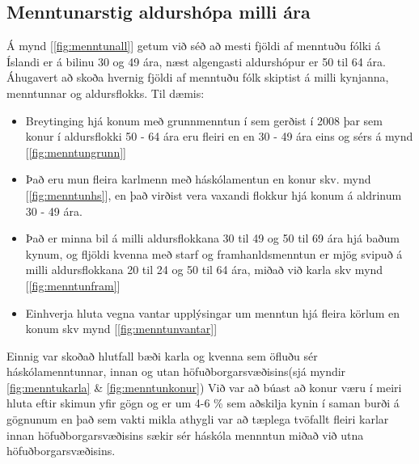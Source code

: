 \documentclass[12pt, git, draft]{rureport}
\begin{document}
\subsection{Menntunarstig aldurshópa milli ára}
Á mynd [\ref{fig:menntunall}] getum við séð að mesti fjöldi af menntuðu fólki á Íslandi er á bilinu 30 og 49 ára, næst algengasti aldurshópur er 50 til 64 ára.
Áhugavert að skoða hvernig fjöldi af menntuðu fólk skiptist á milli kynjanna, menntunnar og aldursflokks. Til dæmis:
\begin{itemize}  
	
	\item Breytinging hjá konum með grunnmenntun í sem gerðist í  2008 þar sem konur í aldursflokki 50 - 64 ára eru fleiri en  en 30 - 49 ára eins og sérs á mynd [\ref{fig:menntungrunn}]
	
	\item Það eru mun fleira karlmenn með háskólamentun en konur skv. mynd [\ref{fig:menntunhs}], en það virðist vera vaxandi flokkur hjá konum á aldrinum 30 - 49 ára.
	
	\item Það er minna bil á milli aldursflokkana 30 til 49 og 50 til 69 ára hjá baðum kynum, og fljöldi kvenna með starf og framhanldsmenntun er mjög svipuð á milli aldursflokkana 20 til 24 og 50 til 64 ára, miðað við karla skv mynd [\ref{fig:menntunfram}] 
	
	\item Einhverja hluta vegna vantar upplýsingar um menntun hjá fleira körlum en konum skv mynd [\ref{fig:menntunvantar}]
	
\end{itemize}

Einnig var skoðað hlutfall bæði karla og kvenna sem öfluðu sér háskólamenntunnar, innan og utan höfuðborgarsvæðisins(sjá myndir \ref{fig:menntukarla} \& \ref{fig:menntunkonur}) Við var að búast að konur væru í meiri hluta eftir skimun yfir gögn  og er um 4-6 \% sem aðskilja kynin í saman burði á gögnunum en það sem vakti mikla athygli var að tæplega tvöfallt fleiri karlar innan höfuðborgarsvæðisins sækir sér háskóla mennntun miðað við utna höfuðborgarsvæðisins.



\end{document}
